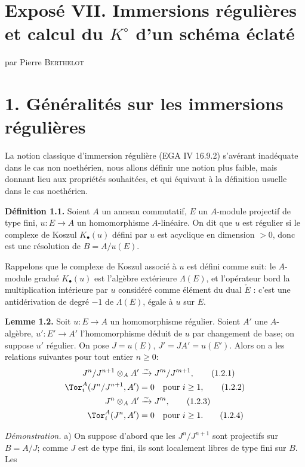 \renewcommand{\Sym}{\operatorname{Sym}}
\renewcommand{\Projz}{\operatorname{Proj}_0}
\section*{Exposé VII. Immersions régulières et calcul du \texorpdfstring{$K^\circ$}{K0} d'un schéma éclaté}
\begin{center}
par Pierre \textsc{Berthelot}
\end{center}

\section*{1. Généralités sur les immersions régulières}

La notion classique d'immersion régulière (EGA IV 16.9.2) s'avérant inadéquate dans le cas non noethérien, nous allons définir une notion plus faible, mais donnant lieu aux propriétés souhaitées, et qui équivaut à la définition usuelle dans le cas noethérien.

\textbf{Définition 1.1.} Soient $A$ un anneau commutatif, $E$ un $A$-module projectif de type fini, $u:E\longrightarrow A$ un homomorphisme $A$-linéaire. On dit que $u$ est régulier si le complexe de Koszul $K_\bullet(u)$ défini par $u$ est acyclique en dimension $>0$, donc est une résolution de $B=A/u(E)$.

Rappelons que le complexe de Koszul associé à $u$ est défini comme suit: le $A$-module gradué $K_\bullet(u)$ est l'algèbre extérieure $\Lambda(E)$, et l'opérateur bord la multiplication intérieure par $u$ considéré comme élément du dual $\check E$ : c'est une antidérivation de degré $-1$ de $\Lambda(E)$, égale à $u$ sur $E$.

\textbf{Lemme 1.2.} Soit $u:E\longrightarrow A$ un homomorphisme régulier. Soient $A'$ une $A$-algèbre, $u':E'\longrightarrow A'$ l'homomorphisme déduit de $u$ par changement de base; on suppose $u'$ régulier. On pose $J=u(E)$, $J'=JA'=u(E')$. Alors on a les relations suivantes pour tout entier $n\geq0$:
\begin{align}
 J^n/J^{n+1}\otimes_AA'&\xrightarrow{\sim}J'^n/J'^{n+1}, \tag{1.2.1}\\
 \Tor_i^A(J^n/J^{n+1},A')&=0\quad\text{pour }i\geq1, \tag{1.2.2}\\
 J^n\otimes_AA'&\xrightarrow{\sim}J'^n, \tag{1.2.3}\\
 \Tor_i^A(J^n,A')&=0\quad\text{pour }i\geq1. \tag{1.2.4}
\end{align}

\emph{Démonstration.} a) On suppose d'abord que les $J^n/J^{n+1}$ sont projectifs sur $B=A/J$; comme $J$ est de type fini, ils sont localement libres de type fini sur $B$. Les
